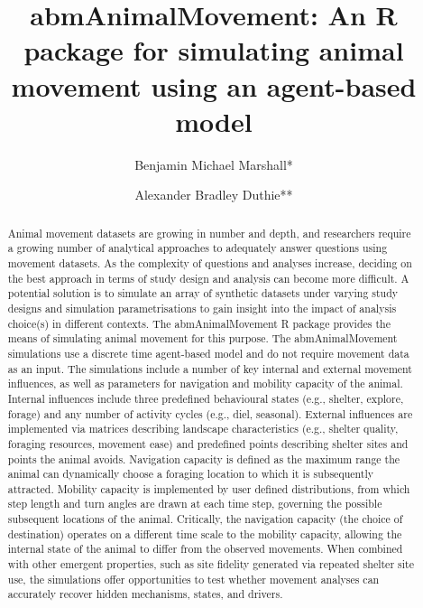 \documentclass[10pt,a4paper]{article}
\begin{document}
\pagestyle{fancy}

\title{abmAnimalMovement: An R package for simulating animal movement using an agent-based model}
\author[1]{Benjamin Michael Marshall*}
\author[1]{Alexander Bradley Duthie**}


\maketitle
\thispagestyle{fancy}

\begin{abstract}

Animal movement datasets are growing in number and depth, and researchers require a growing number of analytical approaches to adequately answer questions using movement datasets. As the complexity of questions and analyses increase, deciding on the best approach in terms of study design and analysis can become more difficult. A potential solution is to simulate an array of synthetic datasets under varying study designs and simulation parametrisations to gain insight into the impact of analysis choice(s) in different contexts. The abmAnimalMovement R package provides the means of simulating animal movement for this purpose. The abmAnimalMovement simulations use a discrete time agent-based model and do not require movement data as an input. The simulations include a number of key internal and external movement influences, as well as parameters for navigation and mobility capacity of the animal. Internal influences include three predefined behavioural states (e.g., shelter, explore, forage) and any number of activity cycles (e.g., diel, seasonal). External influences are implemented via matrices describing landscape characteristics (e.g., shelter quality, foraging resources, movement ease) and predefined points describing shelter sites and points the animal avoids. Navigation capacity is defined as the maximum range the animal can dynamically choose a foraging location to which it is subsequently attracted. Mobility capacity is implemented by user defined distributions, from which step length and turn angles are drawn at each time step, governing the possible subsequent locations of the animal. Critically, the navigation capacity (the choice of destination) operates on a different time scale to the mobility capacity, allowing the internal state of the animal to differ from the observed movements. When combined with other emergent properties, such as site fidelity generated via repeated shelter site use, the simulations offer opportunities to test whether movement analyses can accurately recover hidden mechanisms, states, and drivers.

\end{abstract}
\end{document}
